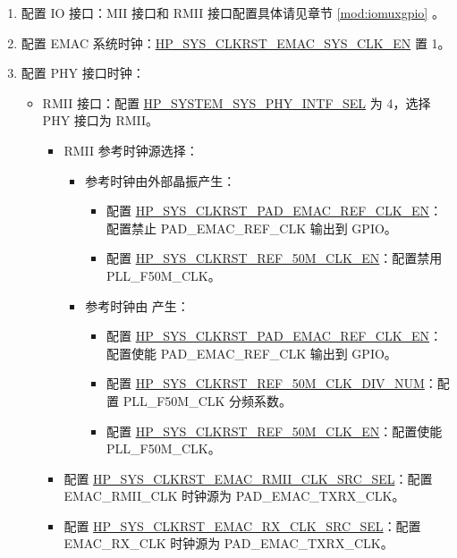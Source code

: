 \documentclass[main\_\_CN.tex]{subfiles}
\begin{document}
\begin{enumerate}
\item 配置 IO 接口：MII 接口和 RMII 接口配置具体请见章节 \ref{mod:iomuxgpio} \textit{}。
\item 配置 EMAC 系统时钟：\hyperref[regdesc:HPSYSCLKRSTSOCCLKCTRL1REG]{HP\_SYS\_CLKRST\_EMAC\_SYS\_CLK\_EN} 置 1。
\item 配置 PHY 接口时钟：
\begin{itemize}
    \item RMII 接口：配置 \hyperref[fielddesc:HPSYSTEMSYSPHYINTFSEL]{HP\_SYSTEM\_SYS\_PHY\_INTF\_SEL} 为 4，选择 PHY 接口为 RMII。
    \begin{itemize}
        \item RMII 参考时钟源选择：
            \begin{itemize}
                \item 参考时钟由外部晶振产生：
                    \begin{itemize}
                        \item 配置 \hyperref[regdesc:HPSYSCLKRSTSOCCLKCTRL1REG]{HP\_SYS\_CLKRST\_PAD\_EMAC\_REF\_CLK\_EN}：配置禁止 PAD\_EMAC\_REF\_CLK 输出到 GPIO。
                        \item 配置 \hyperref[regdesc:HPSYSCLKRSTREFCLKCTRL1REG]{HP\_SYS\_CLKRST\_REF\_50M\_CLK\_EN}：配置禁用 PLL\_F50M\_CLK。
                    \end{itemize}
                \item 参考时钟由 \chipname{} 产生：
                    \begin{itemize}
                        \item 配置 \hyperref[regdesc:HPSYSCLKRSTSOCCLKCTRL1REG]{HP\_SYS\_CLKRST\_PAD\_EMAC\_REF\_CLK\_EN}：配置使能 PAD\_EMAC\_REF\_CLK 输出到 GPIO。
                        \item 配置 \hyperref[regdesc:HPSYSCLKRSTREFCLKCTRL0REG]{HP\_SYS\_CLKRST\_REF\_50M\_CLK\_DIV\_NUM}：配置 PLL\_F50M\_CLK 分频系数。
                        \item 配置 \hyperref[regdesc:HPSYSCLKRSTREFCLKCTRL1REG]{HP\_SYS\_CLKRST\_REF\_50M\_CLK\_EN}：配置使能 PLL\_F50M\_CLK。
                    \end{itemize}
            \end{itemize}
        \item 配置 \hyperref[regdesc:HPSYSCLKRSTSOCCLKCTRL1REG]{HP\_SYS\_CLKRST\_EMAC\_RMII\_CLK\_SRC\_SEL}：配置 EMAC\_RMII\_CLK 时钟源为 PAD\_EMAC\_TXRX\_CLK。
        \item 配置 \hyperref[regdesc:HPSYSCLKRSTSOCCLKCTRL1REG]{HP\_SYS\_CLKRST\_EMAC\_RX\_CLK\_SRC\_SEL}：配置 EMAC\_RX\_CLK 时钟源为 PAD\_EMAC\_TXRX\_CLK。

\end{itemize}
\end{itemize}
\end{enumerate}
\end{document}
